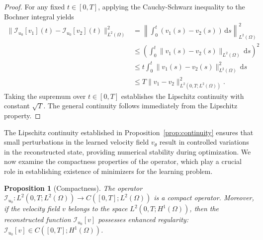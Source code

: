 \documentclass[11pt,reqno]{amsart}
\theoremstyle{plain}
\newtheorem{proposition}[theorem]{Proposition}
\theoremstyle{definition}
\theoremstyle{remark}
\begin{document}
\begin{proof}
For any fixed $t \in [0,T]$, applying the Cauchy-Schwarz inequality to the Bochner integral yields
\begin{align*}
    \|\mathcal{I}_{u_0}[v_1](t) - \mathcal{I}_{u_0}[v_2](t)\|_{L^2(\Omega)}^2 
    &= \left\| \int_0^t (v_1(s) - v_2(s)) \, \mathrm{d}s \right\|_{L^2(\Omega)}^2 \\
    &\leq \left( \int_0^t \|v_1(s) - v_2(s)\|_{L^2(\Omega)} \, \mathrm{d}s \right)^2 \\
    &\leq t \int_0^t \|v_1(s) - v_2(s)\|_{L^2(\Omega)}^2 \, \mathrm{d}s \\
    &\leq T \|v_1 - v_2\|_{L^2(0,T; L^2(\Omega))}^2.
\end{align*}
Taking the supremum over $t \in [0,T]$ establishes the Lipschitz continuity with constant $\sqrt{T}$. The general continuity follows immediately from the Lipschitz property.
\end{proof}

The Lipschitz continuity established in Proposition~\ref{prop:continuity} ensures that small perturbations in the learned velocity field $v_\theta$ result in controlled variations in the reconstructed state, providing numerical stability during optimization. We now examine the compactness properties of the operator, which play a crucial role in establishing existence of minimizers for the learning problem.

\begin{proposition}[Compactness]\label{prop:compactness}
The operator $\mathcal{I}_{u_0}: L^2(0,T; L^2(\Omega)) \to C([0,T]; L^2(\Omega))$ is a compact operator. Moreover, if the velocity field $v$ belongs to the space $L^2(0,T; H^1(\Omega))$, then the reconstructed function $\mathcal{I}_{u_0}[v]$ possesses enhanced regularity: $\mathcal{I}_{u_0}[v] \in C([0,T]; H^1(\Omega))$.
\end{proposition}
\end{document}
